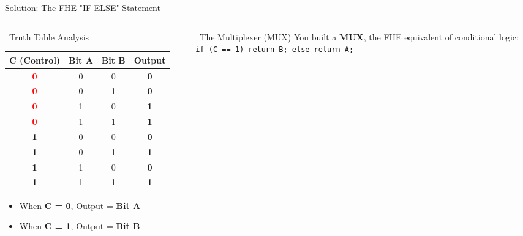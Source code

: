\documentclass[aspectratio=169, 10pt]{beamer}
\begin{document}
\begin{frame}[fragile]{Solution: The FHE "IF-ELSE" Statement}
\begin{columns}[T]

\begin{column}{0.45\textwidth}
    \begin{block}{\faTable \ Truth Table Analysis}
        \vspace*{0.5ex}
        \footnotesize
        \centering
        \renewcommand{\arraystretch}{0.9} %
        \begin{tabular}{ccc|c}
            \textbf{C (Control)} & \textbf{Bit A} & \textbf{Bit B} & \textbf{Output} \\
            \hline
            \textcolor{red}{\textbf{0}} & 0 & 0 & \textbf{0} \\
            \textcolor{red}{\textbf{0}} & 0 & 1 & \textbf{0} \\
            \textcolor{red}{\textbf{0}} & 1 & 0 & \textbf{1} \\
            \textcolor{red}{\textbf{0}} & 1 & 1 & \textbf{1} \\
            \hline
            \textcolor{green!60!black}{\textbf{1}} & 0 & 0 & \textbf{0} \\
            \textcolor{green!60!black}{\textbf{1}} & 0 & 1 & \textbf{1} \\
            \textcolor{green!60!black}{\textbf{1}} & 1 & 0 & \textbf{0} \\
            \textcolor{green!60!black}{\textbf{1}} & 1 & 1 & \textbf{1} \\
        \end{tabular}
        \vspace{0.15cm}
        \begin{itemize}
            \setlength{\itemsep}{0pt}
            \item When \textbf{C = 0}, Output = \textbf{Bit A}
            \item When \textbf{C = 1}, Output = \textbf{Bit B}
        \end{itemize}
    \end{block}
\end{column}

\begin{column}{0.52\textwidth}
    \begin{exampleblock}{\faLightbulb \ The Multiplexer (MUX)}
        \vspace*{0.5ex}
        \footnotesize
        You built a \textbf{MUX}, the FHE equivalent of conditional logic: \\
        \vspace{0.1cm}
        \texttt{\textcolor{DeepBlue}{if} (C == 1) \textcolor{DeepBlue}{return} B; \textcolor{DeepBlue}{else return} A;}
        \vspace{0.2cm}
        

\end{exampleblock}
\end{column}
\end{columns}
\end{frame}
\end{document}
